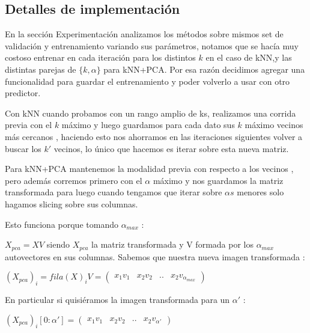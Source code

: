 \subsection{Detalles de implementación}

En la sección Experimentación analizamos los métodos sobre mismos set de validación y entrenamiento variando sus parámetros, notamos que se hacía muy costoso entrenar en cada iteración para los distintos $k$ en el caso de kNN,y las distintas parejas de  $\{ k, \alpha\}$ para kNN+PCA. Por esa razón decidimos agregar una funcionalidad para guardar el entrenamiento y poder volverlo a usar con otro predictor.
\par
Con kNN cuando probamos con un rango amplio de ks, realizamos una corrida previa con el $k$ máximo y luego guardamos para cada dato sus $k$ máximo vecinos más cercanos , haciendo esto nos ahorramos en las iteraciones siguientes volver a buscar los $k'$ vecinos, lo único que hacemos es iterar sobre esta nueva matriz.
\par
Para kNN+PCA mantenemos la modalidad previa con respecto a los vecinos , pero además corremos primero con el $\alpha $ máximo y nos guardamos la matriz transformada para luego cuando tengamos que iterar sobre $\alpha s $ menores solo hagamos slicing sobre sus columnas.
\par
Esto funciona porque tomando $\alpha_{max}$  :
\par
$X_{pca} = XV  $ siendo $X_{pca}$ la matriz transformada y V formada por los $\alpha_{max}$ autovectores en sus columnas.
Sabemos que nuestra nueva imagen transformada :
\par 
$(X_{pca})_i = fila(X)_iV =
\begin{pmatrix}
x_1v_1 & x_2v_2 & ..& x_2v_{\alpha_{max}}
\end{pmatrix}$
\par
En particular si quisiéramos la imagen transformada para un $\alpha'$ :
\par
$(X_{pca})_i[0:\alpha'] = 
\begin{pmatrix}
x_1v_1 & x_2v_2 & ..& x_2v_{\alpha'}
\end{pmatrix}$











